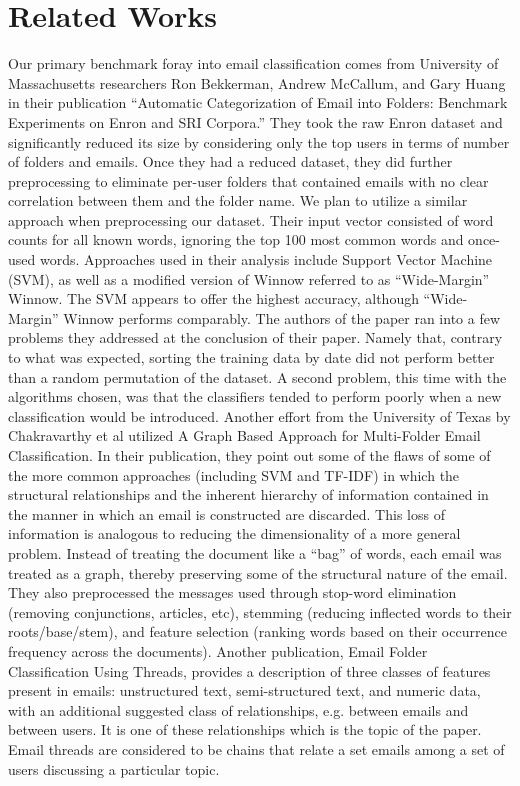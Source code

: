 \documentclass[11pt]{article}
\begin{document}
\section{Related Works}
\label{sec-2}


Our primary benchmark foray into email classification comes from University of Massachusetts researchers Ron Bekkerman, Andrew McCallum, and Gary Huang in their publication “Automatic Categorization of Email into Folders: Benchmark Experiments on Enron and SRI Corpora.”  They took the raw Enron dataset and significantly reduced its size by considering only the top users in terms of number of folders and emails. Once they had a reduced dataset, they did further preprocessing to eliminate per-user folders that contained emails with no clear correlation between them and the folder name. We plan to utilize a similar approach when preprocessing our dataset.
Their input vector consisted of word counts for all known words, ignoring the top 100 most common words and once-used words. Approaches used in their analysis include Support Vector Machine (SVM), as well as a modified version of Winnow referred to as “Wide-Margin” Winnow. The SVM appears to offer the highest accuracy, although “Wide-Margin” Winnow performs comparably.
The authors of the paper ran into a few problems they addressed at the conclusion of their paper.  Namely that, contrary to what was expected, sorting the training data by date did not perform better than a random permutation of the dataset.  A second problem, this time with the algorithms chosen, was that the classifiers tended to perform poorly when a new classification would be introduced.
Another effort from the University of Texas by Chakravarthy et al utilized A Graph Based Approach for Multi-Folder Email Classification.  In their publication, they point out some of the flaws of some of the more common approaches (including SVM and TF-IDF) in which the structural relationships and the inherent hierarchy of information contained in the manner in which an email is constructed are discarded.  This loss of information is analogous to reducing the dimensionality of a more general problem.  Instead of treating the document like a “bag” of words, each email was treated as a graph, thereby preserving some of the structural nature of the email.  They also preprocessed the messages used through stop-word elimination (removing conjunctions, articles, etc), stemming (reducing inflected words to their roots/base/stem), and feature selection (ranking words based on their occurrence frequency across the documents).
Another publication, Email Folder Classification Using Threads, provides a description of three classes of features present in emails: unstructured text, semi-structured text, and numeric data, with an additional suggested class of relationships, e.g. between emails and between users.  It is one of these relationships which is the topic of the paper.  Email threads are considered to be chains that relate a set emails among a set of users discussing a particular topic.
\end{document}
